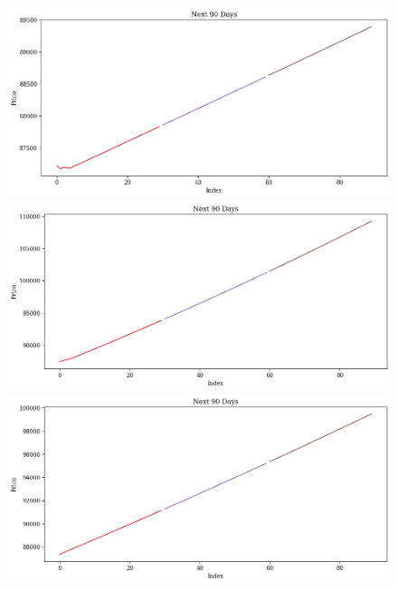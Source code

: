 \begin{figure}[H]
\begin{minipage}{0.15\textwidth}
    \end{minipage}
    \hfill
    \begin{minipage}{0.15\textwidth}
    \centering
    \includegraphics[width=1\textwidth]{resources/chapter-5/newdata1/predicted/VCB_N-HiTS_7-3_90Days.png}
    \end{minipage}
    \hfill
    \begin{minipage}{0.15\textwidth}
    \centering
    \includegraphics[width=1\textwidth]{resources/chapter-5/newdata1/predicted/VCB_N-HiTS_8-2_90Days.png}
    \end{minipage}
    \hfill
        \begin{minipage}{0.15\textwidth}
    \centering
    \includegraphics[width=1\textwidth]{resources/chapter-5/newdata1/predicted/VCB_N-HiTS_9-1_90Days.png}

\end{minipage}
\end{figure}
